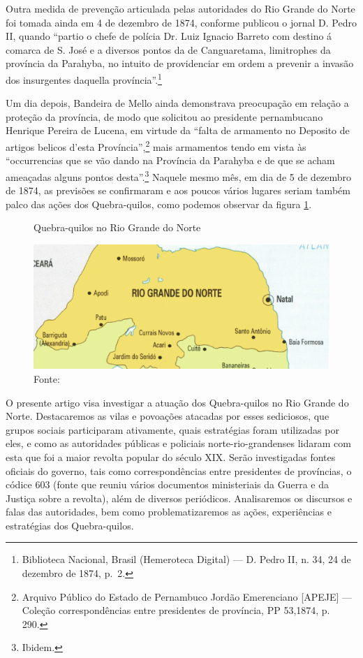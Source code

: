 \begin{refsection}
Outra medida de prevenção articulada pelas autoridades do Rio Grande do Norte foi tomada ainda em 4 de dezembro de 1874, conforme publicou o jornal D. Pedro II, quando “partio o chefe de polícia Dr. Luiz Ignacio Barreto com destino á comarca de S. José e a diversos pontos da de Canguaretama, limitrophes da província da Parahyba, no intuito de providenciar em ordem a prevenir a invasão dos insurgentes daquella província”.\footnote{Biblioteca Nacional, Brasil (Hemeroteca Digital) --- D. Pedro II, n. 34, 24 de dezembro de 1874, p.~2.}

Um dia depois, Bandeira de Mello ainda demonstrava preocupação em relação a proteção da província, de modo que solicitou ao presidente pernambucano Henrique Pereira de Lucena, em virtude da “falta de armamento no Deposito de artigos belicos d’esta Província”,\footnote{Arquivo Público do Estado de Pernambuco Jordão Emerenciano [APEJE] --- Coleção correspondências entre presidentes de província, PP 53,1874, p. 290.} mais armamentos tendo em vista às “occurrencias que se vão dando na Província da Parahyba e de que se acham ameaçadas alguns pontos desta”.\footnote{Ibidem.} Naquele mesmo mês, em dia de 5 de dezembro de 1874, as previsões se confirmaram e aos poucos vários lugares seriam também palco das ações dos Quebra-quilos, como podemos observar da figura \ref{fig:quebra-quilo-rn}. 

\begin{figure}[ht]%
    \centering%
    \caption{Quebra-quilos no Rio Grande do Norte}%
    \includegraphics[width=.75\textwidth]{arcticles/03-nao-ao-peso-nao-ao-r/01-rn.png}%
    \caption*{Fonte: \textcite[p.~17]{Monteiro1993}}%
    \label{fig:quebra-quilo-rn}%
\end{figure}%

O presente artigo visa investigar a atuação dos Quebra-quilos no Rio Grande do Norte. Destacaremos as vilas e povoações atacadas por esses sediciosos, que grupos sociais participaram ativamente, quais estratégias foram utilizadas por eles, e como as autoridades públicas e policiais norte-rio-grandenses lidaram com esta que foi a maior revolta popular do século XIX. Serão investigadas fontes oficiais do governo, tais como correspondências entre presidentes de províncias, o códice 603 (fonte que reuniu vários documentos ministeriais da Guerra e da Justiça sobre a revolta), além de diversos periódicos. Analisaremos os discursos e falas das autoridades, bem como problematizaremos as ações, experiências e estratégias dos Quebra-quilos.


\end{refsection}
